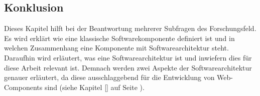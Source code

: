 \subsection{Konklusion}
\label{sec:2_Konklusion}
Dieses Kapitel hilft bei der Beantwortung mehrerer Subfragen des Forschungsfeld. Es wird erklärt wie eine klassische Softwarekomponente definiert ist und in welchen Zusammenhang eine Komponente mit Softwarearchitektur steht. Daraufhin wird erläutert, was eine Softwarearchitektur ist und inwiefern dies für diese Arbeit relevant ist. Demnach werden zwei Aspekte der Softwarearchitektur genauer erläutert, da diese ausschlaggebend für die Entwicklung von Web-Components sind (siehe Kapitel \ref{} auf Seite \pageref{} ).

